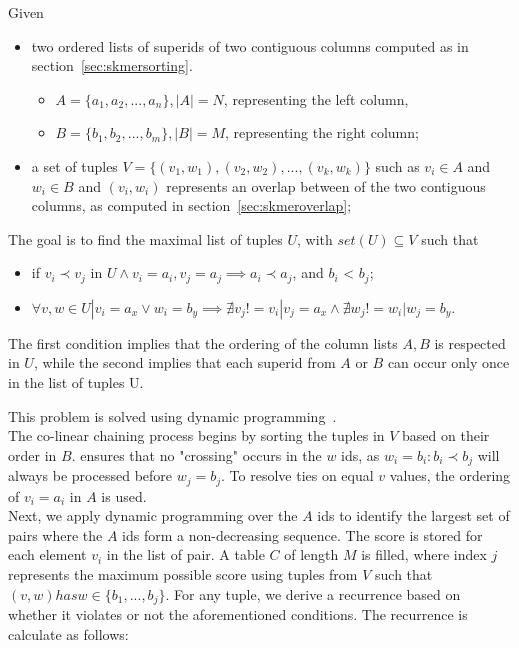 \begin{definition}
	Given 
	\begin{itemize}
		\item two ordered lists of super\kmer ids of two contiguous columns computed as in section~\ref{sec:skmersorting}.
		\begin{itemize}
			\item $ A = \{a_1, a_2, ..., a_n\}, |A| = N $, representing the left column,
			\item $ B = \{b_1, b_2, ..., b_m\}, |B| = M $, representing the right column;
		\end{itemize}
		\item a set of tuples $ V = \{(v_1,w_1),(v_2,w_2), ..., (v_k,w_k) \}$ such as $ v_i \in A$ and $ w_i \in B$ and $(v_i,w_i)$ represents an overlap between \kmers of the two contiguous columns, as computed in section~\ref{sec:skmeroverlap};
	\end{itemize}
	The goal is to find the maximal list of tuples $ U$, with $set(U) \subseteq V$ such that 
	\begin{itemize}
		\item if $v_i \prec v_j$ in $U \land v_i=a_i, v_j=a_j \implies a_i \prec a_j$, and $b_i$ < $b_j$;
		\item $\forall v, w \in U | v_i = a_x \lor w_i = b_y \implies \nexists v_j != v_i | v_j = a_x \land \nexists w_j != w_i | w_j = b_y$.  
	\end{itemize}
	The first condition implies that the ordering of the column lists $A, B$ is respected in $U$, while the second implies that each super\kmer id from $A$ or $B$ can occur only once in the list of tuples U.
\end{definition}
This problem is solved using dynamic programming~\cite{genome_scale}.\\
The co-linear chaining process begins by sorting the tuples in $V$ based on their order in $B$. ensures that no "crossing" occurs in the $w$ ids, as $w_i = b_i: b_i \prec b_j$ will always be processed before $w_j = b_j$. To resolve ties on equal $v$ values, the ordering of $v_i = a_i$ in $A$ is used.\\
Next, we apply dynamic programming over the $A$ ids to identify the largest set of pairs where the $A$ ids form a non-decreasing sequence. The score is stored for each element $v_i$ in the list of pair. A table $C$ of length $M$ is filled, where index $j$ represents the maximum possible score using tuples from $V$ such that $(v,w) has w \in \{b_1,...,b_j\}$. For any tuple, we derive a recurrence based on whether it violates or not the aforementioned conditions. The recurrence is calculate as follows: 
